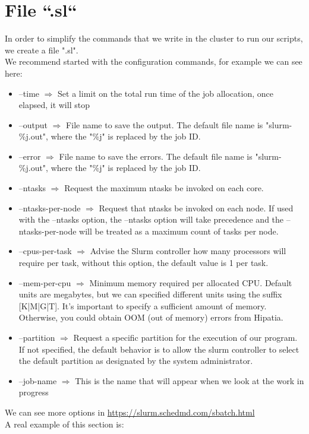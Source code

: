 \documentclass[a4paper]{article}
\begin{document}
	\section{File ``.sl``}
		In order to simplify the commands that we write in the cluster to run our scripts, we create a file ".sl".\\
		We recommend started with the configuration commands, for example we can see here:
		\begin{itemize}
			\item --time $\Rightarrow$ Set a limit on the total run time of the job allocation, once elapsed, it will stop
			\item --output $\Rightarrow$ File name to save the output. The default file name is "slurm-\%j.out", where the "\%j" is replaced by the job ID.
			\item --error $\Rightarrow$  File name to save the errors. The default file name is "slurm-\%j.out", where the "\%j" is replaced by the job ID.
			\item --ntasks $\Rightarrow$ Request the maximum ntasks be invoked on each core.	
			\item --ntasks-per-node $\Rightarrow$ Request that ntasks be invoked on each node. If used with the --ntasks option, the --ntasks option will take precedence and the --ntasks-per-node will be treated as a maximum count of tasks per node.
			\item --cpus-per-task $\Rightarrow$ Advise the Slurm controller how many processors will require per task, without this option, the default value is 1 per task.
			\item --mem-per-cpu $\Rightarrow$ Minimum memory required per allocated CPU. Default units are megabytes, but we can specified different units using the suffix [K|M|G|T]. It's important to specify a sufficient amount of memory. Otherwise, you could obtain OOM (out of memory) errors from Hipatia.
			\item --partition $\Rightarrow$ Request a specific partition for the execution of our program. If not specified, the default behavior is to allow the slurm controller to select the default partition as designated by the system administrator.
			\item --job-name $\Rightarrow$ This is the name that will appear when we look at the work in progress 
		\end{itemize} 
		We can see more options in \url{https://slurm.schedmd.com/sbatch.html}\\
		A real example of this section is:\\
\end{document}
